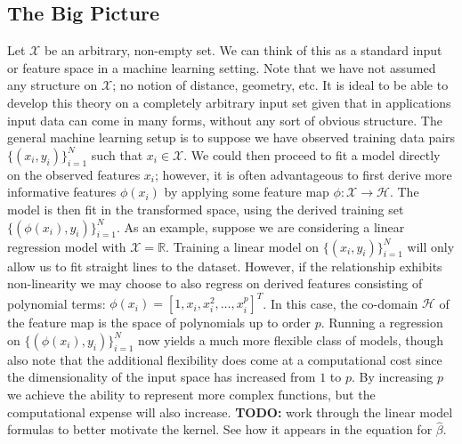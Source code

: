 \documentclass[12pt]{article}
\newcommand{\R}{\mathbb{R}}
\begin{document}
\subsection{The Big Picture}
Let $\mathcal{X}$ be an arbitrary, non-empty set. We can think of this as a standard input or feature space in a machine learning setting. Note that we have not assumed any structure on $\mathcal{X}$; no notion of 
distance, geometry, etc. It is ideal to be able to develop this theory on a completely arbitrary input set given that in applications input data can come in many forms, without any sort of obvious structure. The general 
machine learning setup is to suppose we have observed training data pairs $\{(x_i, y_i)\}_{i = 1}^{N}$ such that $x_i \in \mathcal{X}$. We could then proceed to fit a model directly on the observed features $x_i$; however, 
it is often advantageous to first derive more informative features $\phi(x_i)$ by applying some feature map $\phi: \mathcal{X} \to \mathcal{H}$. The model is then fit in the transformed space, using the derived training set 
$\{(\phi(x_i), y_i)\}_{i = 1}^{N}$. As an example, suppose we are considering a linear regression model with $\mathcal{X} = \R$. Training a linear model on $\{(x_i, y_i)\}_{i = 1}^{N}$ will only allow us to fit straight lines to the 
dataset. However, if the relationship exhibits non-linearity we may choose to also regress on derived features consisting of polynomial terms: $\phi(x_i) = [1, x_i, x_i^2, \dots, x_i^p]^T$. In this case, the co-domain $\mathcal{H}$
of the feature map is the space of polynomials up to order $p$. Running a regression on $\{(\phi(x_i), y_i)\}_{i = 1}^{N}$ now yields a much more flexible class of models, though also note that the additional flexibility does come 
at a computational cost since the dimensionality of the input space has increased from $1$ to $p$. By increasing $p$ we achieve the ability to represent more complex functions, but the computational expense will also increase. 
\textbf{TODO: } work through the linear model formulas to better motivate the kernel. See how it appears in the equation for $\hat{\beta}$. 
\end{document}
